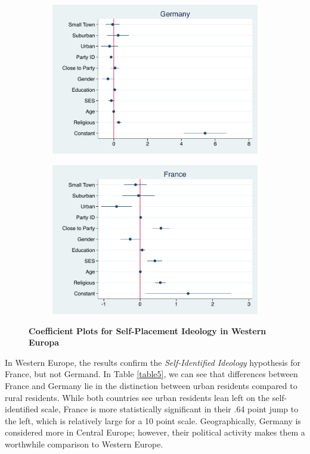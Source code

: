 \documentclass[12pt, titlepage]{article}
\newcommand\e{\emph}
\newcommand\tb{\textbf}
\begin{document}
\begin{figure}[H]
	\centering
	\begin{subfigure}[b]{0.475\textwidth}
		\centering
		\includegraphics[width=\textwidth]{IdeologyCoef/Germany}
	\end{subfigure}
	\hfill
	\begin{subfigure}[b]{0.475\textwidth}  
		\centering 
		\includegraphics[width=\textwidth]{IdeologyCoef/France}
	\end{subfigure}
	\caption[ \tb{Self-Placement Ideology - Western Europe} ]
	{\tb {Coefficient Plots for Self-Placement Ideology in Western Europa} }
	\label{WestEuroIdeo}
\end{figure}

In Western Europe, the results confirm the \e{Self-Identified Ideology} hypothesis for France, but not Germand. In Table \ref{table5}, we can see that differences between France and Germany lie in the distinction between urban residents compared to rural residents. While both countries see urban residents lean left on the self-identified scale, France is more statistically significant in their .64 point jump to the left, which is relatively large for a 10 point scale. Geographically, Germany is considered more in Central Europe; however, their political activity makes them a worthwhile comparison to Western Europe.
\end{document}
